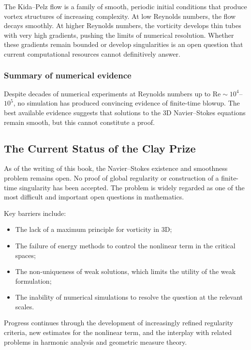 The Kida--Pelz flow is a family of smooth, periodic initial conditions that produce vortex structures of increasing complexity. At low Reynolds numbers, the flow decays smoothly. At higher Reynolds numbers, the vorticity develops thin tubes with very high gradients, pushing the limits of numerical resolution. Whether these gradients remain bounded or develop singularities is an open question that current computational resources cannot definitively answer.

\subsubsection*{Summary of numerical evidence}

Despite decades of numerical experiments at Reynolds numbers up to $\mathrm{Re} \sim 10^4$--$10^5$, no simulation has produced convincing evidence of finite-time blowup. The best available evidence suggests that solutions to the 3D Navier--Stokes equations remain smooth, but this cannot constitute a proof.

\subsection{The Current Status of the Clay Prize}

As of the writing of this book, the Navier--Stokes existence and smoothness problem remains open. No proof of global regularity or construction of a finite-time singularity has been accepted. The problem is widely regarded as one of the most difficult and important open questions in mathematics.

Key barriers include:
\begin{itemize}
\item The lack of a maximum principle for vorticity in 3D;
\item The failure of energy methods to control the nonlinear term in the critical spaces;
\item The non-uniqueness of weak solutions, which limits the utility of the weak formulation;
\item The inability of numerical simulations to resolve the question at the relevant scales.
\end{itemize}

Progress continues through the development of increasingly refined regularity criteria, new estimates for the nonlinear term, and the interplay with related problems in harmonic analysis and geometric measure theory.

